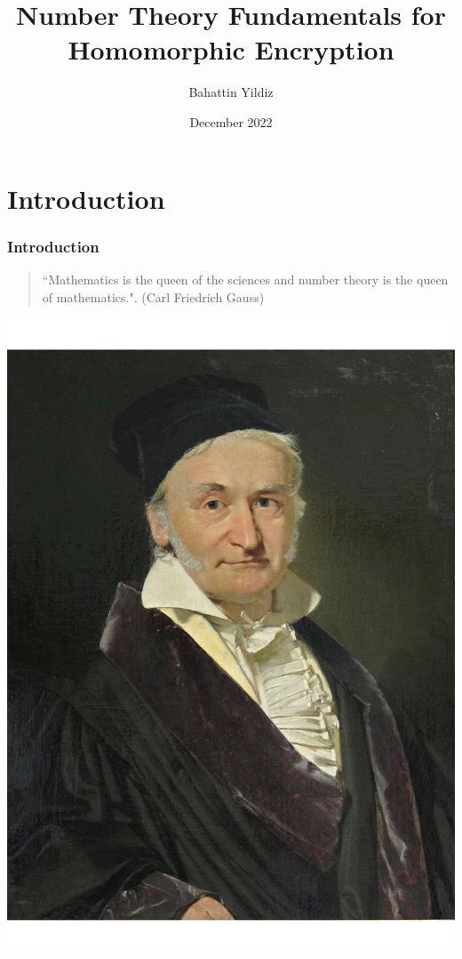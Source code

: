 \documentclass[ %
 usenames,dvipsnames,
aspectratio=169,11pt ]{beamer}
\begin{document}
\title[Number Theory Fundamentals]{
Number Theory Fundamentals for Homomorphic Encryption}
\author{Bahattin Yildiz}
\date[December]{December 2022}
\maketitle

\section{Introduction}

\begin{frame}\frametitle{Introduction}

\begin{quote}
{ ``Mathematics is the queen of the sciences and number theory is the queen of mathematics.". (Carl Friedrich Gauss)}
\end{quote}

\bigskip
\noindent
\begin{center}
    \includegraphics[scale=.20]{Gauss.pdf}
\end{center}
\end{frame}
\end{document}
